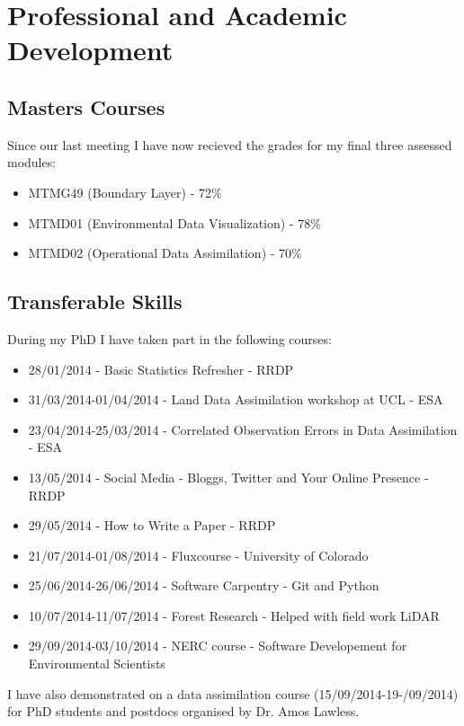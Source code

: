 \documentclass[11pt]{article}
\begin{document}
\section{Professional and Academic Development}

\subsection{Masters Courses}
Since our last meeting I have now recieved the grades for my final three assessed modules:
\begin{itemize}
\item MTMG49 (Boundary Layer) - 72\%
\item MTMD01 (Environmental Data Visualization) - 78\%
\item MTMD02 (Operational Data Assimilation) - 70\%
\end{itemize}

\subsection{Transferable Skills}

During my PhD I have taken part in the following courses:
\begin{itemize}
\item 28/01/2014 - Basic Statistics Refresher - RRDP

\item 31/03/2014-01/04/2014 - Land Data Assimilation workshop at UCL - ESA

\item 23/04/2014-25/03/2014 - Correlated Observation Errors in Data Assimilation - ESA

\item 13/05/2014 - Social Media - Bloggs, Twitter and Your Online Presence - RRDP

\item 29/05/2014 - How to Write a Paper - RRDP

\item 21/07/2014-01/08/2014 - Fluxcourse - University of Colorado

\item 25/06/2014-26/06/2014 - Software Carpentry - Git and Python

\item 10/07/2014-11/07/2014 - Forest Research - Helped with field work LiDAR 

\item 29/09/2014-03/10/2014 - NERC course - Software Developement for Environmental Scientists
\end{itemize}
I have also demonstrated on a data assimilation course (15/09/2014-19-/09/2014) for PhD students and postdocs organised by Dr. Amos Lawless.

{}

\end{document}
